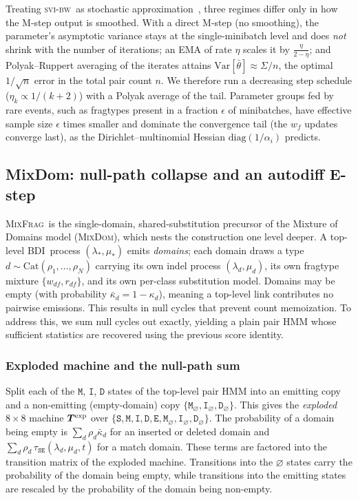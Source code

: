\documentclass[11pt]{article}
\newcommand{\MixFrag}{\textsc{MixFrag}}
\newcommand{\MixDom}{\textsc{MixDom}}
\newcommand{\BDI}{\textsc{BDI}}
\newcommand{\ins}{\lambda}
\newcommand{\del}{\mu}
\newcommand{\svibw}{\textsc{svi-bw}}
\newcommand{\hst}[1]{\texttt{#1}}
\begin{document}
Treating \svibw\ as stochastic approximation~\citep{cappemoulines2009},
three regimes differ only in how the M-step output is smoothed. With a
direct M-step (no smoothing), the parameter's asymptotic variance stays
at the single-minibatch level and does \emph{not} shrink with the number
of iterations; an EMA of rate $\eta$ scales it by $\tfrac{\eta}{2-\eta}$;
and Polyak--Ruppert averaging of the iterates attains
$\mathrm{Var}[\bar\theta]\approx\Sigma/n$, the optimal $1/\sqrt{n}$ error
in the total pair count $n$. We therefore run a decreasing
step schedule ($\eta_k\propto 1/(k{+}2)$) with a Polyak average of the
tail. Parameter groups fed by rare events, such as fragtypes present in
a fraction $\epsilon$ of minibatches, have effective sample size
$\epsilon$ times smaller and dominate the convergence tail (the $w_f$
updates converge last), as the Dirichlet--multinomial Hessian
$\mathrm{diag}(1/\alpha_i)$ predicts.


\subsection{MixDom: null-path collapse and an autodiff E-step}
\label{sec:mixdom}

\MixFrag\ is the single-domain, shared-substitution precursor of the
Mixture of Domains model (\MixDom), which nests the construction one 
level deeper. A top-level \BDI\ process $(\ins_{\!*},\del_{\!*})$ emits 
\emph{domains}; each domain draws a type
$d\sim\mathrm{Cat}(\rho_1,\dots,\rho_N)$ carrying its own indel process
$(\ins_d,\del_d)$, its own fragtype mixture $\{w_{df},r_{df}\}$, and its
own per-class substitution model. 
Domains may be empty (with probability $\bar\kappa_d=1-\kappa_d$), 
meaning a top-level link contributes no pairwise emissions.
This results in null cycles that prevent count memoization. To address this,
we sum null cycles out exactly,
yielding a plain pair HMM whose sufficient statistics are recovered using the 
previous score identity.

\subsubsection{Exploded machine and the null-path sum}

Split each of the $\hst{M}$, $\hst{I}$, $\hst{D}$ states of the
top-level pair HMM into an
emitting copy and a non-emitting (empty-domain) copy
$\{\hst{M}_\varnothing,\hst{I}_\varnothing,\hst{D}_\varnothing\}$. This gives the
\emph{exploded} $8{\times}8$ machine
$\bm{T}^{\rm exp}$ over $\{\hst{S},\hst{M},\hst{I},\hst{D},\hst{E},
\hst{M}_\varnothing,\hst{I}_\varnothing,
\hst{D}_\varnothing\}$.
The probability of a domain being empty is $\sum_d\rho_d\bar\kappa_d$
for an inserted or deleted domain and 
$\sum_d\rho_d\,\tau_{\hst{S}\hst{E}}(\ins_d,\del_d,t)$ for a match domain.
These terms are factored into the transition matrix of the exploded machine.
Transitions into the $\varnothing$ states carry the probability of the domain being empty, while transitions into the emitting states are rescaled by the probability of the domain being non-empty.
\end{document}
